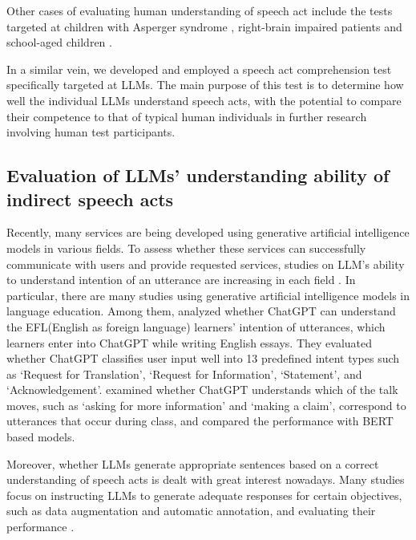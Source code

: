 Other cases of evaluating human understanding of speech act include the tests targeted at children with Asperger syndrome \citep{seo}, right-brain impaired patients \citep{jang} and school-aged children \citep{oh}.

In a similar vein, we developed and employed a speech act comprehension test specifically targeted at LLMs. The main purpose of this test is to determine how well the individual LLMs understand speech acts, with the potential to compare their competence to that of typical human individuals in further research involving human test participants.

\subsection*{Evaluation of LLMs’ understanding ability of indirect speech acts}

Recently, many services are being developed using generative artificial intelligence models in various fields. To assess whether these services can successfully communicate with users and provide requested services, studies on LLM’s ability to understand intention of an utterance are increasing in each field \citep{han, wang, loukas, bouzaki} . In particular, there are many studies using generative artificial intelligence models in language education. Among them, \cite{han} analyzed whether ChatGPT can understand the EFL(English as foreign language) learners’ intention of utterances, which learners enter into ChatGPT while writing English essays. They evaluated whether ChatGPT classifies user input well into 13 predefined intent types such as ‘Request for Translation’, ‘Request for Information’, ‘Statement’, and ‘Acknowledgement’. \cite{wang} examined whether ChatGPT understands which of the talk moves, such as ‘asking for more information’ and ‘making a claim’, correspond to utterances that occur during class, and compared the performance with BERT based models.


Moreover, whether LLMs generate appropriate sentences based on a correct understanding of speech acts is dealt with great interest nowadays. Many studies focus on instructing LLMs to generate adequate responses for certain objectives, such as data augmentation and automatic annotation, and evaluating their performance \citep{bouzaki, ostyakova, yu}.

